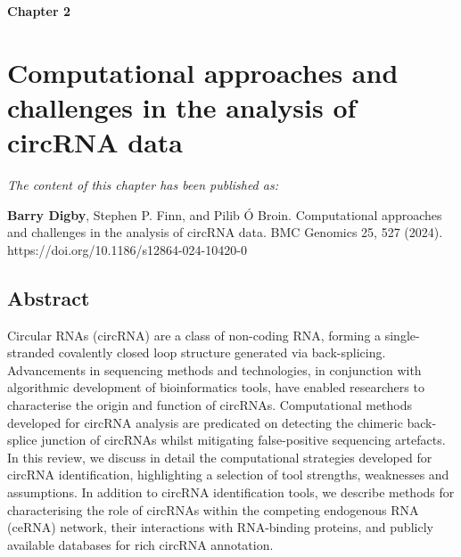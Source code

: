 {\Huge \bfseries \noindent Chapter 2}
\vspace{-1em} 
\section*{\LARGE Computational approaches and challenges in the analysis of circRNA data}
\setcounter{section}{2}
\setcounter{subsection}{0}  %
\newcommand{\code}[1]{\texttt{#1}}
\renewcommand{\chapternum}{2}

\renewcommand{\thefigure}{\chapternum.\arabic{figure}}
\setcounter{figure}{0}
\renewcommand{\thetable}{\chapternum.\arabic{table}}
\setcounter{table}{0}


\begin{center}
    \textit{The content of this chapter has been published as:} \par
    \vspace{0.55cm}
    \textbf{Barry Digby}, Stephen P. Finn, and Pilib Ó Broin. Computational approaches and challenges in the analysis of circRNA data. BMC Genomics 25, 527 (2024). https://doi.org/10.1186/s12864-024-10420-0
\end{center}

\subsection*{Abstract}
Circular RNAs (circRNA) are a class of non-coding RNA, forming a single-stranded covalently closed loop structure generated via back-splicing. Advancements in sequencing methods and technologies, in conjunction with algorithmic development of bioinformatics tools, have enabled researchers to characterise the origin and function of circRNAs. Computational methods developed for circRNA analysis are predicated on detecting the chimeric back-splice junction of circRNAs whilst mitigating false-positive sequencing artefacts. In this review, we discuss in detail the computational strategies developed for circRNA identification, highlighting a selection of tool strengths, weaknesses and assumptions. In addition to circRNA identification tools, we describe methods for characterising the role of circRNAs within the competing endogenous RNA (ceRNA) network, their interactions with RNA-binding proteins, and publicly available databases for rich circRNA annotation.

